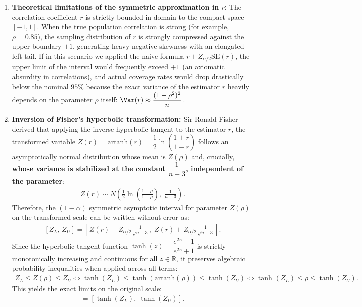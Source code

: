 \begin{solproblema}
	\begin{enumerate}
		\item \textbf{Theoretical limitations of the symmetric approximation in $r$:}
		The correlation coefficient $r$ is strictly bounded in domain to the compact space $[-1, 1]$. When the true population correlation is strong (for example, $\rho = 0.85$), the sampling distribution of $r$ is strongly compressed against the upper boundary $+1$, generating heavy negative skewness with an elongated left tail. If in this scenario we applied the naive formula $r \pm Z_{\alpha/2}\text{SE}(r)$, the upper limit of the interval would frequently exceed $+1$ (an axiomatic absurdity in correlations), and actual coverage rates would drop drastically below the nominal $95\%$ because the exact variance of the estimator $r$ heavily depends on the parameter $\rho$ itself: $\Var(r) \approx \dfrac{(1-\rho^2)^2}{n}$.
		
		\item \textbf{Inversion of Fisher's hyperbolic transformation:}
		Sir Ronald Fisher derived that applying the inverse hyperbolic tangent to the estimator $r$, the transformed variable $Z(r) = \text{artanh}(r) = \dfrac{1}{2}\ln\left(\dfrac{1+r}{1-r}\right)$ follows an asymptotically normal distribution whose mean is $Z(\rho)$ and, crucially, \textbf{whose variance is stabilized at the constant $\dfrac{1}{n-3}$, independent of the parameter}:
		\begin{align}
			Z(r) \sim N\left( \frac{1}{2}\ln\left(\frac{1+\rho}{1-\rho}\right), \; \frac{1}{n-3} \right).
		\end{align}
		Therefore, the $(1-\alpha)$ symmetric asymptotic interval for parameter $Z(\rho)$ on the transformed scale can be written without error as:
		\begin{align}
			\left[ Z_L, \, Z_U \right] = \left[ Z(r) - Z_{\alpha/2} \frac{1}{\sqrt{n-3}}, \; Z(r) + Z_{\alpha/2} \frac{1}{\sqrt{n-3}} \right].
		\end{align}
		Since the hyperbolic tangent function $\tanh(z) = \dfrac{e^{2z}-1}{e^{2z}+1}$ is strictly monotonically increasing and continuous for all $z \in \mathbb{R}$, it preserves algebraic probability inequalities when applied across all terms:
		\begin{align}
			Z_L \le Z(\rho) \le Z_U \iff \tanh(Z_L) \le \tanh\left(\text{artanh}(\rho)\right) \le \tanh(Z_U) \iff \tanh(Z_L) \le \rho \le \tanh(Z_U).
		\end{align}
		This yields the exact limits on the original scale:
		\begin{align}
			[L_\rho, \, U_\rho] = \left[ \tanh(Z_L), \; \tanh(Z_U) \right].
		\end{align}
		

\end{enumerate}
\end{solproblema}
